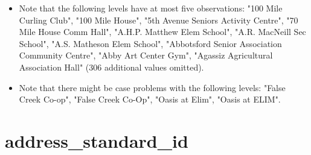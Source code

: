 \documentclass[
]{report}
\begin{document}
\begin{itemize}
\item
  Note that the following levels have at most five observations: "100
  Mile Curling Club", "100 Mile House", "5th Avenue Seniors Activity
  Centre", "70 Mile House Comm Hall", "A.H.P. Matthew Elem School",
  "A.R. MacNeill Sec School", "A.S. Matheson Elem School", "Abbotsford
  Senior Association Community Centre", "Abby Art Center Gym", "Agassiz
  Agricultural Association Hall" (306 additional values omitted).
\item
  Note that there might be case problems with the following levels:
  "False Creek Co-op", "False Creek Co-Op", "Oasis at Elim", "Oasis at
  ELIM".
\end{itemize}

\noindent\makebox[\linewidth]{\rule{\textwidth}{0.4pt}}

\hypertarget{address_standard_id}{%
\section{address\_standard\_id}\label{address_standard_id}}
\end{document}
